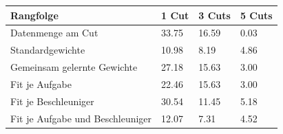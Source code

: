 \begin{tabular}{@{}llll@{}}
\toprule
Rangfolge & 1 Cut & 3 Cuts & 5 Cuts \\
\midrule
Datenmenge am Cut & 33.75 & 16.59 & 0.03 \\
Standardgewichte & 10.98 & 8.19 & 4.86 \\
Gemeinsam gelernte Gewichte & 27.18 & 15.63 & 3.00 \\
Fit je Aufgabe & 22.46 & 15.63 & 3.00 \\
Fit je Beschleuniger & 30.54 & 11.45 & 5.18 \\
Fit je Aufgabe und Beschleuniger & 12.07 & 7.31 & 4.52 \\
\bottomrule
\end{tabular}
